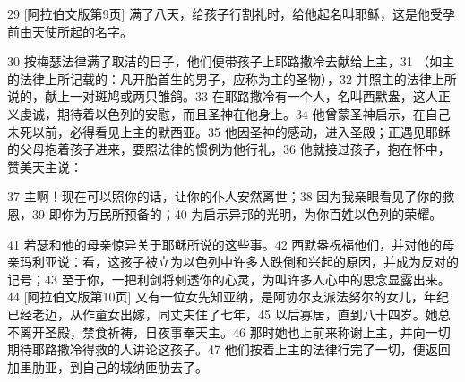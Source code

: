 29 [阿拉伯文版第9页]  满了八天，给孩子行割礼时，给他起名叫耶稣，这是他受孕前由天使所起的名字。\par

30  按梅瑟法律满了取洁的日子，他们便带孩子上耶路撒冷去献给上主，31  （如主的法律上所记载的：凡开胎首生的男子，应称为主的圣物），32  并照主的法律上所说的，献上一对斑鸠或两只雏鸽。33  在耶路撒冷有一个人，名叫西默盎，这人正义虔诚，期待着以色列的安慰，而且圣神在他身上。34  他曾蒙圣神启示，在自己未死以前，必得看见上主的默西亚。35  他因圣神的感动，进入圣殿；正遇见耶稣的父母抱着孩子进来，要照法律的惯例为他行礼，36  他就接过孩子，抱在怀中，赞美天主说：\par

37  主啊！现在可以照你的话，\newline{}让你的仆人安然离世；\newline{}38  因为我亲眼看见了你的救恩，\newline{}39  即你为万民所预备的；\newline{}40  为启示异邦的光明，\newline{}为你百姓以色列的荣耀。\par

41  若瑟和他的母亲惊异关于耶稣所说的这些事。42  西默盎祝福他们，并对他的母亲玛利亚说：看，这孩子被立为以色列中许多人跌倒和兴起的原因，并成为反对的记号；43  至于你，一把利剑将刺透你的心灵，为叫许多人心中的思念显露出来。44 [阿拉伯文版第10页]  又有一位女先知亚纳，是阿协尔支派法努尔的女儿，年纪已经老迈，从作童女出嫁，同丈夫住了七年，45  以后寡居，直到八十四岁。她总不离开圣殿，禁食祈祷，日夜事奉天主。46  那时她也上前来称谢上主，并向一切期待耶路撒冷得救的人讲论这孩子。47  他们按着上主的法律行完了一切，便返回加里肋亚，到自己的城纳匝肋去了。\par



\section{}

